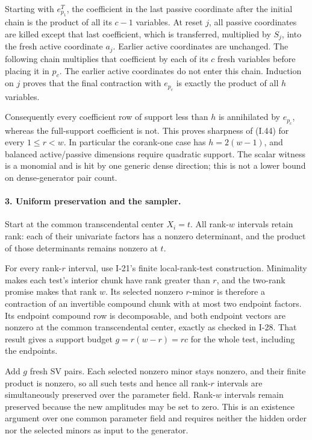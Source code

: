 \documentclass[11pt,a4paper]{article}
\theoremstyle{definition}\newtheorem{definition}{Definition}
\begin{document}
Starting with $e_{p_1}^T$, the coefficient in the last
passive coordinate after the initial chain is the product
of all its $c-1$ variables.  At reset $j$, all passive
coordinates are killed except that last coefficient,
which is transferred, multiplied by $S_j$, into the
fresh active coordinate $a_j$.  Earlier active coordinates
are unchanged.  The following chain multiplies that
coefficient by each of its $c$ fresh variables before
placing it in $p_c$.  The earlier active coordinates
do not enter this chain.  Induction on $j$ proves that
the final contraction with $e_{p_c}$ is exactly the
product of all $h$ variables.

Consequently every coefficient row of support less than
$h$ is annihilated by $e_{p_c}$, whereas the full-support
coefficient is not.  This proves sharpness of (I.44) for
every $1\le r<w$.  In particular the corank-one case has
$h=2(w-1)$, and balanced active/passive dimensions require
quadratic support.  The scalar witness is a monomial and
is hit by one generic dense direction; this is not a
lower bound on dense-generator pair count.

\paragraph{3. Uniform preservation and the sampler.}
Start at the common transcendental center $X_i=t$.
All rank-$w$ intervals retain rank: each of their univariate
factors has a nonzero determinant, and the product of those
determinants remains nonzero at $t$.

For every rank-$r$ interval, use I-21's finite local-rank-test
construction.  Minimality makes each test's interior chunk
have rank greater than $r$, and the two-rank promise makes
that rank $w$.  Its selected nonzero $r$-minor is therefore
a contraction of an invertible compound chunk with at most
two endpoint factors.  Its endpoint compound row is
decomposable, and both endpoint vectors are nonzero at the
common transcendental center, exactly as checked in I-28.
That result gives a support budget $g=r(w-r)=rc$ for the
whole test, including the endpoints.

Add $g$ fresh SV pairs.  Each selected nonzero minor stays
nonzero, and their finite product is nonzero, so all such
tests and hence all rank-$r$ intervals are simultaneously
preserved over the parameter field.  Rank-$w$ intervals
remain preserved because the new amplitudes may be set to
zero.  This is an existence argument over one common
parameter field and requires neither the hidden order nor
the selected minors as input to the generator.
\end{document}
